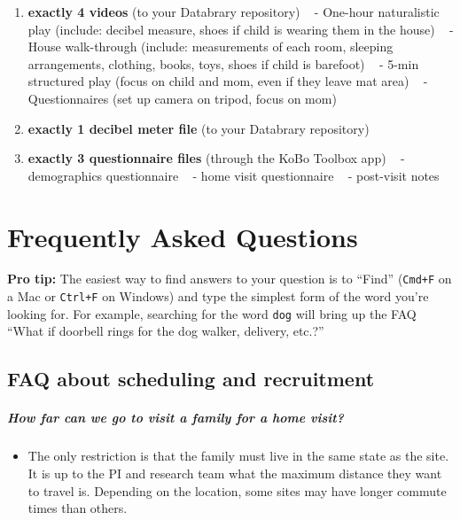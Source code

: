 \documentclass[
]{book}
\providecommand{\tightlist}{%
  \setlength{\itemsep}{0pt}\setlength{\parskip}{0pt}}
\begin{document}
\begin{enumerate}
\def\labelenumi{\arabic{enumi}.}
\tightlist
\item
  \textbf{exactly 4 videos} (to your Databrary repository)
  ~ - One-hour naturalistic play (include: decibel measure, shoes if child is wearing them in the house)
  ~ - House walk-through (include: measurements of each room, sleeping arrangements, clothing, books, toys, shoes if child is barefoot)
  ~ - 5-min structured play (focus on child and mom, even if they leave mat area)
  ~ - Questionnaires (set up camera on tripod, focus on mom)
\item
  \textbf{exactly 1 decibel meter file} (to your Databrary repository)
\item
  \textbf{exactly 3 questionnaire files} (through the KoBo Toolbox app)
  ~ - demographics questionnaire
  ~ - home visit questionnaire
  ~ - post-visit notes
\end{enumerate}

\hypertarget{frequently-asked-questions}{%
\chapter{Frequently Asked Questions}\label{frequently-asked-questions}}

\textbf{Pro tip:} The easiest way to find answers to your question is to ``Find'' (\texttt{Cmd+F} on a Mac or \texttt{Ctrl+F} on Windows) and type the simplest form of the word you're looking for. For example, searching for the word \texttt{dog} will bring up the FAQ ``What if doorbell rings for the dog walker, delivery, etc.?''

\hypertarget{faq-about-scheduling-and-recruitment}{%
\section{FAQ about scheduling and recruitment}\label{faq-about-scheduling-and-recruitment}}

\hypertarget{how-far-can-we-go-to-visit-a-family-for-a-home-visit}{%
\paragraph*{How far can we go to visit a family for a home visit?}\label{how-far-can-we-go-to-visit-a-family-for-a-home-visit}}

\begin{itemize}
\tightlist
\item
  The only restriction is that the family must live in the same state as the site. It is up to the PI and research team what the maximum distance they want to travel is. Depending on the location, some sites may have longer commute times than others.
\end{itemize}
\end{document}
